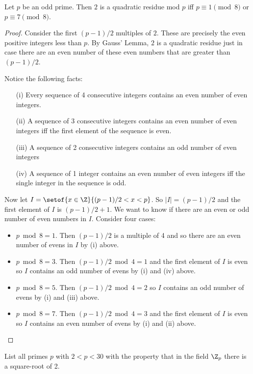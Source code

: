 \documentclass[oneside,12pt]{amsart}
\begin{document}
\begin{theorem}
Let $p$ be an odd prime. Then $2$ is a quadratic residue mod $p$ iff $p\equiv 1 \pmod 8$ or $p\equiv 7 \pmod 8$.
\end{theorem}
\begin{proof}
Consider the first $(p-1)/2$ multiples of $2$. These are precisely the even positive integers less than $p$. By Gauss' Lemma, $2$ is
a quadratic residue just in case there are an even number of these even numbers that are greater than $(p-1)/2$. 

Notice the following facts:
\begin{enumerate}
\item[(i)] Every sequence of 4 consecutive integers contains an even number of even integers.
\item[(ii)] A sequence of 3 consecutive integers contains an even number of even integers iff the first element of the sequence is even.
\item[(iii)] A sequence of 2 consecutive integers contains an odd number of even integers
\item[(iv)] A sequence of 1 integer contains an even number of even integers iff the single integer in the sequence is odd.
\end{enumerate}

Now let $I=\setof{x\in\Z}{(p-1)/2 < x < p}$. So $|I|=(p-1)/2$ and the first element of $I$ is $(p-1)/2 + 1$.
We want to know if there are an even or odd number of even numbers in $I$.
Consider four cases:

\begin{itemize}
\item $p\bmod 8 = 1$. Then $(p-1)/2$ is a multiple of 4 and so there are an even number of evens in $I$ by (i) above.
\item $p\bmod 8 = 3$. Then $(p-1)/2 \bmod 4 = 1$ and the first element of $I$ is even so $I$ contains an odd number of evens by (i) and (iv) above.
\item $p\bmod 8 = 5$. Then $(p-1)/2 \bmod 4 = 2$ so $I$ contains an odd number of evens by (i) and (iii) above.
\item $p\bmod 8 = 7$. Then $(p-1)/2 \bmod 4 = 3$ and the first element of $I$ is even so $I$ contains an even number of evens by (i) and (ii) above.
\end{itemize}

\end{proof}

\begin{homework}
List all primes $p$ with $2<p<30$ with the property that in the field $\Z_p$ there is a square-root of 2.
\end{homework}
\end{document}
